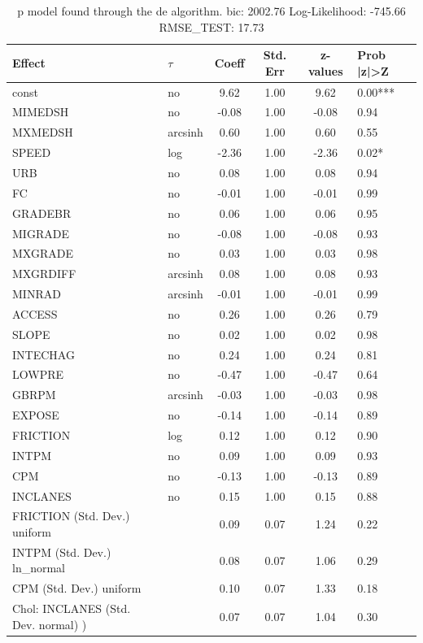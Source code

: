 \begin{table}
	\caption{p model found through the de algorithm. bic: 2002.76 Log-Likelihood: -745.66 RMSE_TEST: 17.73}
	\begin{center}
		\begin{tabular}{|l|l|c|c|c|l|}
			\hline
			Effect & $\tau$ & Coeff & Std. Err & z-values & Prob |z|>Z \\
			\hline
			const & no & 9.62 & 1.00 & 9.62 & 0.00*** \\
			\hline
			MIMEDSH & no & -0.08 & 1.00 & -0.08 & 0.94 \\
			\hline
			MXMEDSH & arcsinh & 0.60 & 1.00 & 0.60 & 0.55 \\
			\hline
			SPEED & log & -2.36 & 1.00 & -2.36 & 0.02* \\
			\hline
			URB & no & 0.08 & 1.00 & 0.08 & 0.94 \\
			\hline
			FC & no & -0.01 & 1.00 & -0.01 & 0.99 \\
			\hline
			GRADEBR & no & 0.06 & 1.00 & 0.06 & 0.95 \\
			\hline
			MIGRADE & no & -0.08 & 1.00 & -0.08 & 0.93 \\
			\hline
			MXGRADE & no & 0.03 & 1.00 & 0.03 & 0.98 \\
			\hline
			MXGRDIFF & arcsinh & 0.08 & 1.00 & 0.08 & 0.93 \\
			\hline
			MINRAD & arcsinh & -0.01 & 1.00 & -0.01 & 0.99 \\
			\hline
			ACCESS & no & 0.26 & 1.00 & 0.26 & 0.79 \\
			\hline
			SLOPE & no & 0.02 & 1.00 & 0.02 & 0.98 \\
			\hline
			INTECHAG & no & 0.24 & 1.00 & 0.24 & 0.81 \\
			\hline
			LOWPRE & no & -0.47 & 1.00 & -0.47 & 0.64 \\
			\hline
			GBRPM & arcsinh & -0.03 & 1.00 & -0.03 & 0.98 \\
			\hline
			EXPOSE & no & -0.14 & 1.00 & -0.14 & 0.89 \\
			\hline
			FRICTION & log & 0.12 & 1.00 & 0.12 & 0.90 \\
			\hline
			INTPM & no & 0.09 & 1.00 & 0.09 & 0.93 \\
			\hline
			CPM & no & -0.13 & 1.00 & -0.13 & 0.89 \\
			\hline
			INCLANES & no & 0.15 & 1.00 & 0.15 & 0.88 \\
			\hline
			FRICTION (Std. Dev.) uniform &  & 0.09 & 0.07 & 1.24 & 0.22 \\
			\hline
			INTPM (Std. Dev.) ln_normal &  & 0.08 & 0.07 & 1.06 & 0.29 \\
			\hline
			CPM (Std. Dev.) uniform &  & 0.10 & 0.07 & 1.33 & 0.18 \\
			\hline
			 Chol: INCLANES (Std. Dev. normal) ) &  & 0.07 & 0.07 & 1.04 & 0.30 \\
			\hline
		\end{tabular}
	\end{center}
\end{table}